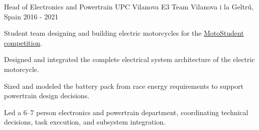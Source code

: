\cventry
  {Head of Electronics and Powertrain}
  {UPC Vilanova E3 Team}
  {Vilanova i la Geltr\'u, Spain}
  {2016 - 2021}
  {
    \begin{cvitems}
      \item {Student team designing and building electric motorcycles for the \href{https://www.motostudent.com/}{MotoStudent competition}.}
      \item {Designed and integrated the complete electrical system architecture of the electric motorcycle.}
      \item {Sized and modeled the battery pack from race energy requirements to support powertrain design decisions.}
      \item {Led a 6--7 person electronics and powertrain department, coordinating technical decisions, task execution, and subsystem integration.}
    \end{cvitems}
  }
